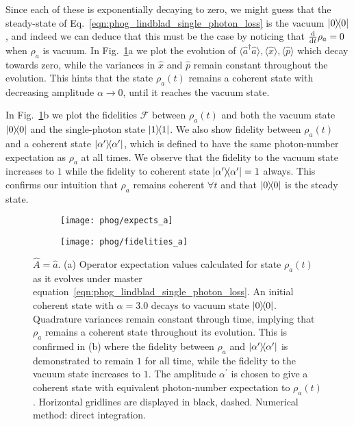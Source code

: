\noindent Since each of these is exponentially decaying to zero, we might guess that the steady-state of Eq.~\ref{eqn:phog_lindblad_single_photon_loss} is the vacuum $\dyad{0}$, and indeed we can deduce that this must be the case by noticing that $\frac{\mathrm{d}}{\mathrm{d}t} \rho_a = 0$ when $\rho_a$ is vacuum. In Fig.~\ref{fig:phog_lindblad_single_photon_loss}a we plot the evolution of $\langle\hat{a}^\dagger \hat{a}\rangle, \langle \hat{x}\rangle, \langle \hat{p}\rangle$ which decay towards zero, while the variances in $\hat{x}$ and $\hat{p}$ remain constant throughout the evolution. This hints that the state $\rho_a\left(t\right)$ remains a coherent state with decreasing amplitude $\alpha\rightarrow0$, until it reaches the vacuum state.

In Fig.~\ref{fig:phog_lindblad_single_photon_loss}b we plot the fidelities $\mathcal{F}$ between $\rho_a\left(t\right)$ and both the vacuum state $\dyad{0}$ and the single-photon state $\dyad{1}$. We also show fidelity between $\rho_a\left(t\right)$ and a coherent state $\dyad{\alpha^\prime}$, which is defined to have the same photon-number expectation as $\rho_a$ at all times. We observe that the fidelity to the vacuum state increases to $1$ while the fidelity to coherent state $\dyad{\alpha^\prime}=1$ always. This confirms our intuition that $\rho_a$ remains coherent $\forall t$ and that $\dyad{0}$ is the steady state. 


\begin{figure}[htp]
\captionsetup{width=0.8\linewidth}
\centering
	\begin{subfigure}{0.7\linewidth}
	\centering
	\caption{}
	\texttt{[image: phog/expects\_a]}
	\end{subfigure}
	\begin{subfigure}{0.7\linewidth}
	\centering
	\caption{}
	\texttt{[image: phog/fidelities\_a]}
	\end{subfigure}
\caption{\label{fig:phog_lindblad_single_photon_loss}$\hat{A} = \hat{a}$. (a) Operator expectation values calculated for state $\rho_a\left(t\right)$ as it evolves under master equation~\ref{eqn:phog_lindblad_single_photon_loss}. An initial coherent state with $\alpha=3.0$ decays to vacuum state $\dyad{0}$. Quadrature variances remain constant through time, implying that $\rho_a$ remains a coherent state throughout its evolution. This is confirmed in (b) where the fidelity between $\rho_a$ and $\dyad{\alpha^\prime}$ is demonstrated to remain $1$ for all time, while the fidelity to the vacuum state increases to $1$. The amplitude $\alpha^\prime$ is chosen to give a coherent state with equivalent photon-number expectation to $\rho_a\left(t\right)$. Horizontal gridlines are displayed in black, dashed. Numerical method: direct integration.}
\end{figure}


